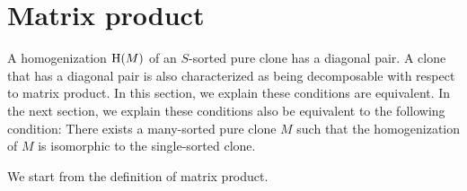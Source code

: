 \documentclass[a4paper,10pt]{article}
\theoremstyle{definition}
\begin{document}
\section{Matrix product} \label{s-matrix-product}

A homogenization ${\rm H}(M)$ of an $S$-sorted pure clone has a diagonal pair.
A clone that has a diagonal pair is also characterized 
as being decomposable with respect to matrix product.
In this section, we explain these conditions are equivalent.
In the next section, we explain these conditions also be equivalent to
the following condition: There exists a many-sorted pure clone $M$ such that
the homogenization of $M$ is isomorphic to the single-sorted clone.

We start from the definition of matrix product.
\end{document}
